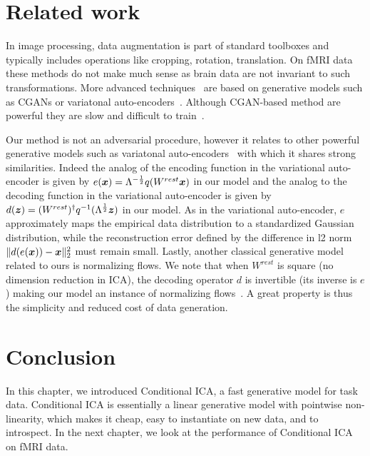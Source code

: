\section{Related work}
In image processing, data augmentation is part of standard toolboxes and
typically includes operations like cropping, rotation, translation.
%
On fMRI data these methods do not make much sense as brain data are not invariant to such transformations.
%
More advanced techniques~\cite{zhuang2019fmri} %
are based on generative models such as CGANs or variatonal
auto-encoders~\cite{kingma2013auto}. Although CGAN-based method are powerful they are slow and difficult to train~\cite{arjovsky_wasserstein_2017}.

Our method is not an adversarial procedure, however it relates to other
powerful generative models such as variatonal
auto-encoders~\cite{kingma2013auto} with which it shares strong similarities.
Indeed the analog of the encoding function in the variational auto-encoder is
given by $e(\boldsymbol{x}) = \Lambda^{-\frac12}q(W^{rest} \boldsymbol{x})$ in our model and the analog to the decoding
function in the variational auto-encoder is given by $d(\boldsymbol{z}) =
(W^{rest})^{\dagger}q^{-1}(\Lambda^{\frac12}\boldsymbol{z})$ in our model. As in the variational auto-encoder, $e$ approximately maps the empirical data distribution to a standardized Gaussian distribution,
while the reconstruction error defined by the difference in l2 norm
$\|d(e(\boldsymbol{x})) - \boldsymbol{x}\|^2_2$ must remain small.
Lastly, another classical generative model related to ours is normalizing
flows.  We note that when $W^{rest}$ is square (no dimension reduction in ICA), the decoding operator $d$ is invertible (its inverse is $e$) making our
model an instance of normalizing flows~\cite{rezende2015variational}. 
%
A great property is thus the simplicity and reduced cost of data generation.

\section{Conclusion}
In this chapter, we introduced Conditional ICA, a fast generative model for task
data.
Conditional ICA is essentially a linear generative model with
pointwise non-linearity, which makes it cheap, easy to instantiate on new data,
and to introspect.
In the next chapter, we look at the performance of Conditional ICA on fMRI data.

